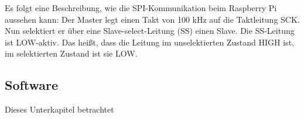 Es folgt eine Beschreibung, wie die \ac{SPI}-Kommunikation beim Raspberry Pi aussehen kann: Der Master legt einen Takt von 100 kHz auf die Taktleitung SCK. Nun selektiert er über eine Slave-select-Leitung (SS) einen Slave. Die SS-Leitung ist LOW-aktiv. Das heißt, dass die Leitung im unselektierten Zustand HIGH ist, im selektierten Zustand ist sie LOW. 

 




 
\subsection{Software}
Dieses Unterkapitel betrachtet 
 





          
 
